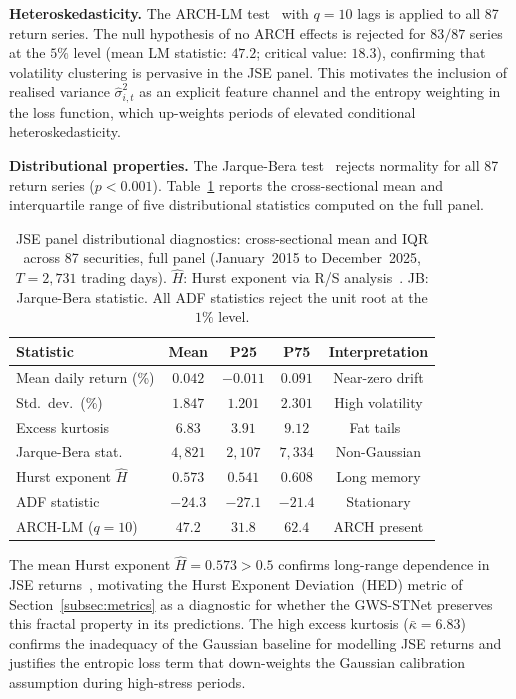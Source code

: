 \documentclass[11pt,a4paper]{article}  %
\theoremstyle{plain}
\theoremstyle{definition}
\theoremstyle{remark}
\begin{document}
\textbf{Heteroskedasticity.} The ARCH-LM test~\cite{Engle1982}
with $q = 10$ lags is applied to all 87 return series. The
null hypothesis of no ARCH effects is rejected for $83/87$
series at the $5\%$ level (mean LM statistic: $47.2$; critical
value: $18.3$), confirming that volatility clustering is
pervasive in the JSE panel. This motivates the inclusion of
realised variance $\hat{\sigma}^2_{i,t}$ as an explicit feature
channel and the entropy weighting in the loss function, which
up-weights periods of elevated conditional heteroskedasticity.

\textbf{Distributional properties.} The Jarque-Bera
test~\cite{Jarque1987} rejects normality for all 87 return
series ($p < 0.001$). Table~\ref{tab:diagnostics} reports
the cross-sectional mean and interquartile range of five
distributional statistics computed on the full panel.

\begin{table}[H]
\centering
\caption{JSE panel distributional diagnostics: cross-sectional
mean and IQR across 87 securities, full panel
(January~2015 to December~2025, $T = 2{,}731$ trading days).
$\hat{H}$: Hurst exponent via R/S analysis~\cite{Hurst1951}.
JB: Jarque-Bera statistic. All ADF statistics reject the unit
root at the $1\%$ level.}
\label{tab:diagnostics}
\setlength{\tabcolsep}{5pt}
\begin{tabular}{lcccc}
\toprule
\textbf{Statistic} & \textbf{Mean} & \textbf{P25} & \textbf{P75}
  & \textbf{Interpretation} \\
\midrule
Mean daily return (\%)   & $0.042$  & $-0.011$ & $0.091$ & Near-zero drift \\
Std.\ dev.\ (\%)         & $1.847$  & $1.201$  & $2.301$ & High volatility \\
Excess kurtosis          & $6.83$   & $3.91$   & $9.12$  & Fat tails~\cite{Cont2001} \\
Jarque-Bera stat.        & $4{,}821$ & $2{,}107$ & $7{,}334$ & Non-Gaussian \\
Hurst exponent $\hat{H}$ & $0.573$  & $0.541$  & $0.608$ & Long memory \\
ADF statistic            & $-24.3$  & $-27.1$  & $-21.4$ & Stationary \\
ARCH-LM ($q=10$)         & $47.2$   & $31.8$   & $62.4$  & ARCH present \\
\bottomrule
\end{tabular}
\end{table}

The mean Hurst exponent $\hat{H} = 0.573 > 0.5$ confirms
long-range dependence in JSE returns~\cite{Cont2001}, motivating
the Hurst Exponent Deviation~(HED) metric of
Section~\ref{subsec:metrics} as a diagnostic for whether the
GWS-STNet preserves this fractal property in its predictions.
The high excess kurtosis ($\bar{\kappa} = 6.83$) confirms the
inadequacy of the Gaussian baseline for modelling JSE returns
and justifies the entropic loss term that down-weights the
Gaussian calibration assumption during high-stress periods.
\end{document}
